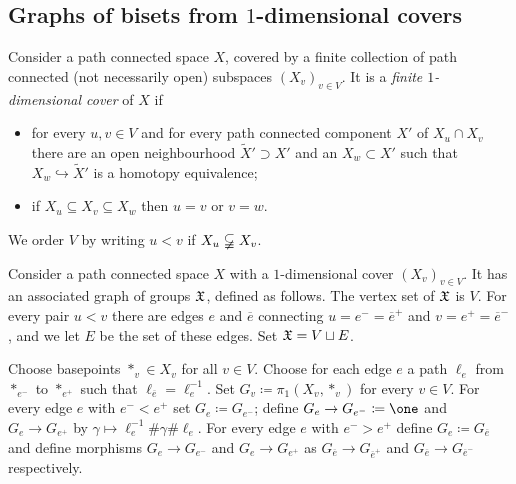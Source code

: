 \documentclass{amsart}
\begin{document}
\subsection{\myboldmath Graphs of bisets from $1$-dimensional covers}
\begin{defn}\label{defn:1dimcovers}
  Consider a path connected space $X$, covered by a finite collection
  of path connected (not necessarily open) subspaces $(X_v)_{v\in
    V}$. It is a \emph{finite $1$-dimensional cover} of $X$ if
  \begin{itemize}
  \item for every $u,v\in V$ and for every path connected component $X'$ of
    $X_{u}\cap X_{v}$ there are an open neighbourhood
    $\widetilde X'\supset X'$ and an $X_{w}\subset X'$ such that
    $X_{w}\hookrightarrow \widetilde X'$ is a homotopy equivalence;
  \item if $X_{u}\subseteq X_{v}\subseteq X_{w}$ then $u=v$ or $v=w$.
  \end{itemize}
  We order $V$ by writing $u<v$ if $X_{u}\varsubsetneqq X_{v}$.
\end{defn}

\begin{defn}\label{defn:gog_1dimcovers}
  Consider a path connected space $X$ with a $1$-dimensional cover
  $(X_v)_{v\in V}$. It has an associated graph of groups ${\mathfrak X}$, defined as
  follows. The vertex set of ${\mathfrak X}$ is $V$. For every pair $u<v$ there are
  edges $e$ and $\overline e$ connecting $u=e^-=\overline e^+$ and $v=e^+=\overline e^-$,
  and we let $E$ be the set of these edges. Set ${\mathfrak X}=V\sqcup E$.

  Choose basepoints $*_v\in X_v$ for all $v\in V$. Choose for each
  edge $e$ a path $\ell_e$ from $*_{e^-}$ to $*_{e^+}$ such that
  $\ell_{\overline e}=\ell^{-1}_{e}$.  Set $G_v\coloneqq\pi_1(X_v,*_v)$ for
  every $v\in V$. For every edge $e$ with $e^-<e^+$ set
  $G_e\coloneqq G_{e^-}$; define $G_e\to G_{e^-}\coloneqq\one$ and
  $G_e\to G_{e^+}$ by $\gamma\mapsto\ell_e^{-1}\#\gamma\#\ell_e$. For
  every edge $e$ with $e^->e^+$ define $G_{e}\coloneqq G_{\overline e}$ and
  define morphisms $G_e\to G_{e^-}$ and $G_e\to G_{e^+}$ as
  $G_{\overline e}\to G_{\overline e^+}$ and $G_{\overline e}\to G_{\overline e^-}$
  respectively.
\end{defn}
\end{document}
